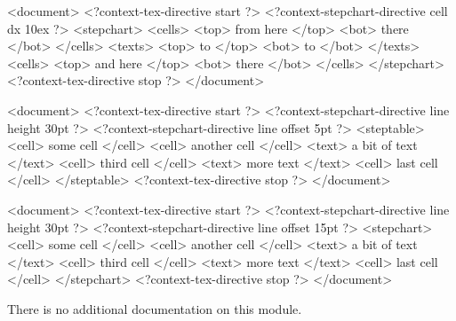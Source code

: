\typebuffer \processxmlbuffer

\startbuffer
<document>
  <?context-tex-directive start ?>
  <?context-stepchart-directive cell dx 10ex ?>
  <stepchart>
    <cells> <top> from here </top> <bot> there </bot> </cells>
    <texts> <top> to        </top> <bot> to    </bot> </texts>
    <cells> <top> and here  </top> <bot> there </bot> </cells>
  </stepchart>
  <?context-tex-directive stop ?>
</document>
\stopbuffer

\typebuffer \processxmlbuffer

\startbuffer
<document>
  <?context-tex-directive start ?>
  <?context-stepchart-directive line height 30pt ?>
  <?context-stepchart-directive line offset  5pt ?>
  <steptable>
    <cell> some cell </cell>
    <cell> another cell </cell> <text> a bit of text </text>
    <cell> third cell </cell> <text> more text </text>
    <cell> last cell </cell>
  </steptable>
  <?context-tex-directive stop ?>
</document>
\stopbuffer

\typebuffer \processxmlbuffer

\startbuffer
<document>
  <?context-tex-directive start ?>
  <?context-stepchart-directive line height 30pt ?>
  <?context-stepchart-directive line offset 15pt ?>
  <stepchart>
    <cell> some cell </cell>
    <cell> another cell </cell> <text> a bit of text </text>
    <cell> third cell </cell> <text> more text </text>
    <cell> last cell </cell>
  </stepchart>
  <?context-tex-directive stop ?>
</document>
\stopbuffer

\typebuffer \processxmlbuffer

\stopsection

\startsection[title=Documentation]

There is no additional documentation on this module.

\stopsection

\stopdocument
